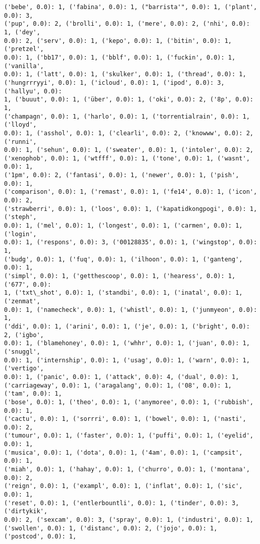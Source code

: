 \documentclass[11pt]{article}
\begin{document}
\begin{Verbatim}[commandchars=\\\{\}]
('bebe', 0.0): 1, ('fabina', 0.0): 1, ("barrista'", 0.0): 1, ('plant', 0.0): 3,
('pup', 0.0): 2, ('brolli', 0.0): 1, ('mere', 0.0): 2, ('nhi', 0.0): 1, ('dey',
0.0): 2, ('serv', 0.0): 1, ('kepo', 0.0): 1, ('bitin', 0.0): 1, ('pretzel',
0.0): 1, ('bb17', 0.0): 1, ('bblf', 0.0): 1, ('fuckin', 0.0): 1, ('vanilla',
0.0): 1, ('latt', 0.0): 1, ('skulker', 0.0): 1, ('thread', 0.0): 1,
('hungrrryyi', 0.0): 1, ('icloud', 0.0): 1, ('ipod', 0.0): 3, ('hallyu', 0.0):
1, ('buuut', 0.0): 1, ('über', 0.0): 1, ('oki', 0.0): 2, ('8p', 0.0): 1,
('champagn', 0.0): 1, ('harlo', 0.0): 1, ('torrentialrain', 0.0): 1, ('lloyd',
0.0): 1, ('asshol', 0.0): 1, ('clearli', 0.0): 2, ('knowww', 0.0): 2, ('runni',
0.0): 1, ('sehun', 0.0): 1, ('sweater', 0.0): 1, ('intoler', 0.0): 2,
('xenophob', 0.0): 1, ('wtfff', 0.0): 1, ('tone', 0.0): 1, ('wasnt', 0.0): 1,
('1pm', 0.0): 2, ('fantasi', 0.0): 1, ('newer', 0.0): 1, ('pish', 0.0): 1,
('comparison', 0.0): 1, ('remast', 0.0): 1, ('fe14', 0.0): 1, ('icon', 0.0): 2,
('strawberri', 0.0): 1, ('loos', 0.0): 1, ('kapatidkongpogi', 0.0): 1, ('steph',
0.0): 1, ('mel', 0.0): 1, ('longest', 0.0): 1, ('carmen', 0.0): 1, ('login',
0.0): 1, ('respons', 0.0): 3, ('00128835', 0.0): 1, ('wingstop', 0.0): 1,
('budg', 0.0): 1, ('fuq', 0.0): 1, ('ilhoon', 0.0): 1, ('ganteng', 0.0): 1,
('simpl', 0.0): 1, ('getthescoop', 0.0): 1, ('hearess', 0.0): 1, ('677', 0.0):
1, ('txt\_shot', 0.0): 1, ('standbi', 0.0): 1, ('inatal', 0.0): 1, ('zenmat',
0.0): 1, ('namecheck', 0.0): 1, ('whistl', 0.0): 1, ('junmyeon', 0.0): 1,
('ddi', 0.0): 1, ('arini', 0.0): 1, ('je', 0.0): 1, ('bright', 0.0): 2, ('igbo',
0.0): 1, ('blamehoney', 0.0): 1, ('whhr', 0.0): 1, ('juan', 0.0): 1, ('snuggl',
0.0): 1, ('internship', 0.0): 1, ('usag', 0.0): 1, ('warn', 0.0): 1, ('vertigo',
0.0): 1, ('panic', 0.0): 1, ('attack', 0.0): 4, ('dual', 0.0): 1,
('carriageway', 0.0): 1, ('aragalang', 0.0): 1, ('08', 0.0): 1, ('tam', 0.0): 1,
('bose', 0.0): 1, ('theo', 0.0): 1, ('anymoree', 0.0): 1, ('rubbish', 0.0): 1,
('cactu', 0.0): 1, ('sorrri', 0.0): 1, ('bowel', 0.0): 1, ('nasti', 0.0): 2,
('tumour', 0.0): 1, ('faster', 0.0): 1, ('puffi', 0.0): 1, ('eyelid', 0.0): 1,
('musica', 0.0): 1, ('dota', 0.0): 1, ('4am', 0.0): 1, ('campsit', 0.0): 1,
('miah', 0.0): 1, ('hahay', 0.0): 1, ('churro', 0.0): 1, ('montana', 0.0): 2,
('reign', 0.0): 1, ('exampl', 0.0): 1, ('inflat', 0.0): 1, ('sic', 0.0): 1,
('reset', 0.0): 1, ('entlerbountli', 0.0): 1, ('tinder', 0.0): 3, ('dirtykik',
0.0): 2, ('sexcam', 0.0): 3, ('spray', 0.0): 1, ('industri', 0.0): 1,
('swollen', 0.0): 1, ('distanc', 0.0): 2, ('jojo', 0.0): 1, ('postcod', 0.0): 1,

\end{Verbatim}
\end{document}
